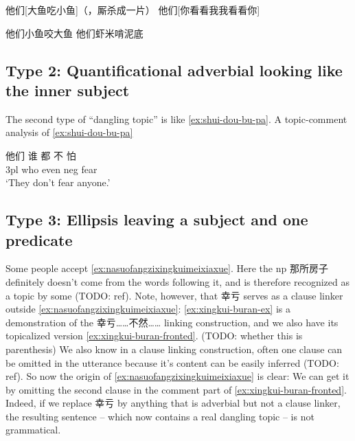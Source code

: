 \documentclass[UTF8, a4paper, oneside, scheme=plain, 12pt]{ctexrep}
\newcommand{\translate}[1]{`#1'}
\begin{document}
\begin{exe}
    \ex\label{ex:dayuchixiaoyu} 他们[大鱼吃小鱼]（，厮杀成一片）
    \ex\label{ex:nikankanwo} 他们[你看看我我看看你]
    
    \ex\label{ex:dayuchixiaoyu-2} \begin{xlist}
        \ex *他们小鱼咬大鱼 
        \ex *他们虾米啃泥底
    \end{xlist}
\end{exe}

\subsection{Type 2: Quantificational adverbial looking like the inner subject}

The second type of ``dangling topic'' is like \eqref{ex:shui-dou-bu-pa}.
A topic-comment analysis of \eqref{ex:shui-dou-bu-pa} 

\begin{exe}
    \ex\label{ex:shui-dou-bu-pa} \gll 他们 谁 都 不 怕 \\
    3pl who even \acs{neg} fear \\
    \glt \translate{They don't fear anyone.}
\end{exe}

\subsection{Type 3: Ellipsis leaving a subject and one predicate}

Some people accept \eqref{ex:nasuofangzixingkuimeixiaxue}.
Here the \acs{np} 那所房子 definitely doesn't come from the words following it,
and is therefore recognized as a topic by some (TODO: ref). 
Note, however, that 幸亏 serves as a clause linker outside \eqref{ex:nasuofangzixingkuimeixiaxue}:
\eqref{ex:xingkui-buran-ex} is a demonstration of the 幸亏……不然…… linking construction,
and we also have its topicalized version \eqref{ex:xingkui-buran-fronted}. (TODO: whether this is parenthesis)
We also know in a clause linking construction,
often one clause can be omitted in the utterance because it's content can be easily inferred (TODO: ref).
So now the origin of \eqref{ex:nasuofangzixingkuimeixiaxue} is clear:
We can get it by omitting the second clause in the comment part of \eqref{ex:xingkui-buran-fronted}.
Indeed, if we replace 幸亏 by anything that is adverbial but not a clause linker,
the resulting sentence -- which now contains a real dangling topic -- is not grammatical.
\end{document}
